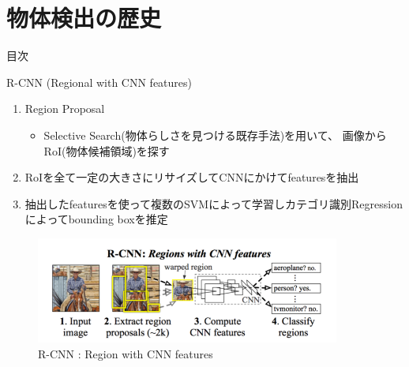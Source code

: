 \documentclass[aspectratio=169, dvipdfmx, 11pt]{beamer}
\begin{document}
\section{物体検出の歴史}
\begin{frame}{目次}
    \tableofcontents[currentsection]
\end{frame}

\begin{frame}{R-CNN (Regional with CNN features)}
    \begin{enumerate}
    	\item Region Proposal \\
        \begin{itemize}
        	\item Selective Search(物体らしさを見つける既存手法)を用いて、
            画像からRoI(物体候補領域)を探す \\
        \end{itemize}
        \item RoIを全て一定の大きさにリサイズしてCNNにかけてfeaturesを抽出 \\
        \item 抽出したfeaturesを使って複数のSVMによって学習しカテゴリ識別Regressionによってbounding boxを推定 \\
    \end{enumerate}

    \begin{figure}[htbp]
        \centering
		\includegraphics[width=10cm]{./figures/rcnn1.png}
        \caption{R-CNN : Region with CNN features}
    \end{figure}
\end{frame}
\end{document}
